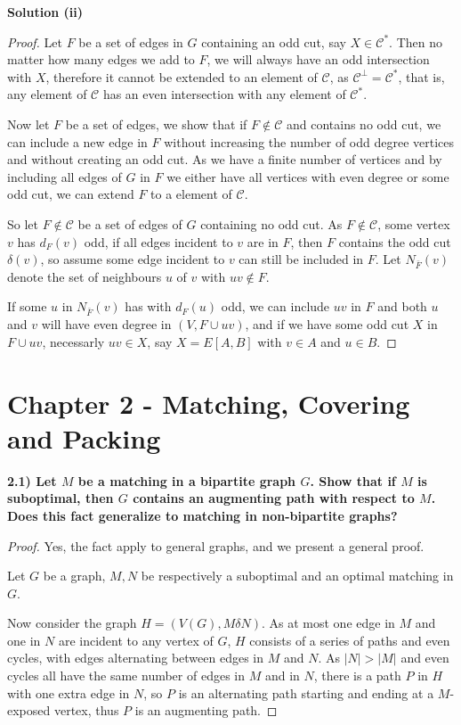 \documentclass[11pt]{article}
\theoremstyle{plain}
\begin{document}
\noindent \textbf{Solution (ii)}

\begin{proof}
Let $F$ be a set of edges in $G$ containing an odd cut, say $X \in \mathcal{C}^*$. Then no matter how many edges we add to $F$, we will always have an odd intersection with $X$, therefore it cannot be extended to an element of $\mathcal{C}$, as $\mathcal{C}^\perp = \mathcal{C}^*$, that is, any element of $\mathcal{C}$ has an even intersection with any element of $\mathcal{C}^*$.

Now let $F$ be a set of edges, we show that if $F \not \in \mathcal{C}$ and contains no odd cut, we can include a new edge in $F$ without increasing the number of odd degree vertices and without creating an odd cut. As we have a finite number of vertices and by including all edges of $G$ in $F$ we either have all vertices with even degree or some odd cut, we can extend $F$ to a element of $\mathcal{C}$.

So let $F \not \in \mathcal{C}$ be a set of edges of $G$ containing no odd cut. As $F \not \in \mathcal{C}$, some vertex $v$ has $d_F(v)$ odd, if all edges incident to $v$ are in $F$, then $F$ contains the odd cut $\delta(v)$, so assume some edge incident to $v$ can still be included in $F$. Let $N_{\bar{F}}(v)$ denote the set of neighbours $u$ of $v$ with $uv \not \in F$.

If some $u$ in $N_{\bar{F}}(v)$ has with $d_F(u)$ odd, we can include $uv$ in $F$ and both $u$ and $v$ will have even degree in $(V,F \cup uv)$, and if we have some odd cut $X$ in $F \cup uv$, necessarly $uv \in X$, say $X = E[A,B]$ with $v \in A$ and $u \in B$.
\end{proof}

\newpage
\section*{Chapter 2 - Matching, Covering and Packing}

\textbf{2.1) Let $M$ be a matching in a bipartite graph $G$. Show that if $M$ is suboptimal, then $G$ contains an augmenting path with respect to $M$. Does this fact generalize to matching in non-bipartite graphs?}

\begin{proof}
Yes, the fact apply to general graphs, and we present a general proof.

Let $G$ be a graph, $M,N$ be respectively a suboptimal and an optimal matching in $G$. 

Now consider the graph $H=(V(G),M\delta N)$.
As at most one edge in $M$ and one in $N$ are incident to any vertex of $G$, $H$ consists of a series of paths and even cycles, with edges alternating between edges in $M$ and $N$. As $|N|>|M|$ and even cycles all have the same number of edges in $M$ and in $N$, there is a path $P$ in $H$ with one extra edge in $N$, so $P$ is an alternating path starting and ending at a $M$-exposed vertex, thus $P$ is an augmenting path.
\end{proof}
\end{document}
